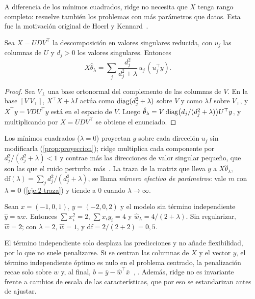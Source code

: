 A diferencia de los mínimos cuadrados, ridge no necesita que $X$ tenga rango completo: resuelve también los problemas con más parámetros que datos. Esta fue la motivación original de Hoerl y Kennard~\cite{hoerl}.

\begin{proposicion}\label{prop:ridge-svd}
Sea $X=UDV^{\top}$ la descomposición en valores singulares reducida, con $u_j$ las columnas de $U$ y $d_j>0$ los valores singulares. Entonces
\[
X\hat\theta_\lambda=\sum_{j}\frac{d_j^{2}}{d_j^{2}+\lambda}\,u_j\,(u_j^{\top}y).
\]
\end{proposicion}

\begin{proof}
Sea $V_\perp$ una base ortonormal del complemento de las columnas de $V$. En la base $[V\ V_\perp]$, $X^{\top}X+\lambda I$ actúa como $\operatorname{diag}(d_j^{2}+\lambda)$ sobre $V$ y como $\lambda I$ sobre $V_\perp$, y $X^{\top}y=VDU^{\top}y$ está en el espacio de $V$. Luego $\hat\theta_\lambda=V\operatorname{diag}\bigl(d_j/(d_j^{2}+\lambda)\bigr)U^{\top}y$, y multiplicando por $X=UDV^{\top}$ se obtiene el enunciado.
\end{proof}

Los mínimos cuadrados ($\lambda=0$) proyectan $y$ sobre cada dirección $u_j$ sin modificarla (\cref{prop:proyeccion}); ridge multiplica cada componente por $d_j^{2}/(d_j^{2}+\lambda)<1$ y contrae más las direcciones de valor singular pequeño, que son las que el ruido perturba más~\cite[§3.4.1]{esl}. La traza de la matriz que lleva $y$ a $X\hat\theta_\lambda$, $\mathrm{df}(\lambda)=\sum_j d_j^{2}/(d_j^{2}+\lambda)$, se llama \emph{número efectivo de parámetros}: vale $m$ con $\lambda=0$ (\cref{eje:2-traza}) y tiende a 0 cuando $\lambda\to\infty$.

\begin{ejemplo}\label{ej:ridge}
Sean $x=(-1,0,1)$, $y=(-2,0,2)$ y el modelo sin término independiente $\hat y=wx$. Entonces $\sum x_i^{2}=2$, $\sum x_iy_i=4$ y $\hat w_\lambda=4/(2+\lambda)$. Sin regularizar, $\hat w=2$; con $\lambda=2$, $\hat w=1$, y $\mathrm{df}=2/(2+2)=0{,}5$.
\end{ejemplo}

\begin{observacion}
El término independiente solo desplaza las predicciones y no añade flexibilidad, por lo que no suele penalizarse. Si se centran las columnas de $X$ y el vector $y$, el término independiente óptimo es nulo en el problema centrado, la penalización recae solo sobre $w$ y, al final, $b=\bar y-\hat w^{\top}\bar x$~\cite[§2.6 y §2.7.2]{mit6390}, \cite[§3.4.1]{esl}. Además, ridge no es invariante frente a cambios de escala de las características, que por eso se estandarizan antes de ajustar.
\end{observacion}

